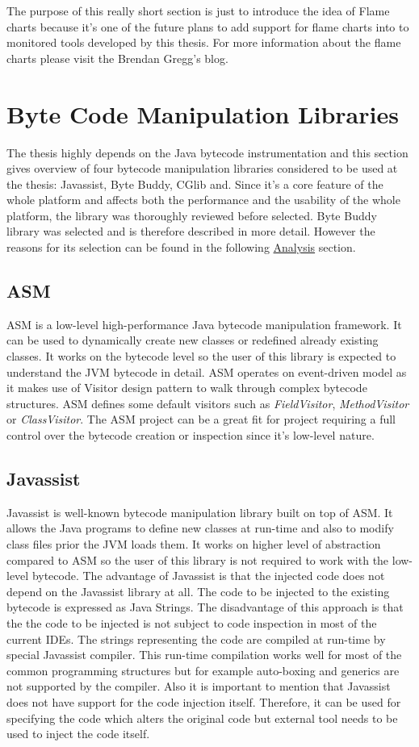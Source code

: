 The purpose of this really short section is just to introduce the idea of Flame charts because it's one of the future plans to add support for flame charts into to monitored tools developed by this thesis. For more information about the flame charts please visit the Brendan Gregg's blog.
\section{Byte Code Manipulation Libraries}
The thesis highly depends on the Java bytecode instrumentation and this section gives overview of four bytecode manipulation libraries considered to be used at the thesis:  Javassist, Byte Buddy, CGlib and. Since it's a core feature of the whole platform and affects both the performance and the usability of the whole platform, the library was thoroughly reviewed before selected. Byte Buddy library was selected and is therefore described in more detail. However the reasons for its selection can be found in the following \hyperref[analysis]{Analysis} section.

\subsection{ASM}
\label{asm}
ASM is a low-level high-performance Java bytecode manipulation framework. It can be used to dynamically create new classes or redefined already existing classes. It works on the bytecode level so the user of this library is expected to understand the JVM bytecode in detail. ASM operates on event-driven model as it makes use of Visitor design pattern to walk through complex bytecode structures. ASM defines some default visitors such as \textit{FieldVisitor}, \textit{MethodVisitor} or \textit{ClassVisitor}. The ASM project can be a great fit for project requiring a full control over the bytecode creation or inspection since it's low-level nature.
\subsection{Javassist}
\label{javassist}
Javassist is well-known bytecode manipulation library built on top of ASM. It allows the Java programs to define new classes at run-time and also to modify class files prior the JVM loads them. It works on higher level of abstraction compared to ASM so the user of this library is not required to work with the low-level bytecode. The advantage of Javassist is that the injected code does not depend on the Javassist library at all. The code to be injected to the existing bytecode is expressed as Java Strings. The disadvantage of this approach is that the the code to be injected is not subject to code inspection in most of the current IDEs. The strings representing the code are compiled at run-time by special Javassist compiler. This run-time compilation works well for most of the common programming structures but for example auto-boxing and generics are not supported by the compiler. Also it is important to mention that Javassist does not have support for the code injection itself. Therefore, it can be used for specifying the code which alters the original code but external tool needs to be used to inject the code itself.
